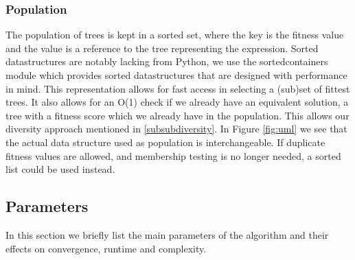 \subsubsection{Population}
The population of trees is kept in a sorted set, where the key is the fitness value and the value is a reference to the tree representing the expression.  Sorted datastructures are notably lacking from Python, we use the sortedcontainers \cite{sortedcontainers} module which provides sorted datastructures that are designed with performance in mind. 
This representation allows for fast access in selecting a (sub)set of fittest trees. It also allows for an O(1) check if we already have an equivalent solution, a tree with a fitness score which we already have in the population. This allows our diversity approach mentioned in \ref{subsubdiversity}.
In Figure \ref{fig:uml} we see that the actual data structure used as population is interchangeable. If duplicate fitness values are allowed, and membership testing is no longer needed, a sorted list could be used instead.

\subsection{Parameters}
In this section we briefly list the main parameters of the algorithm and their effects on convergence, runtime and complexity.
